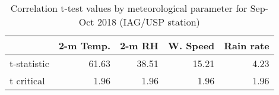 \begin{table}
\centering
\caption{Correlation t-test values by meteorological parameter for Sep-Oct 2018 (IAG/USP station)}
\label{tab: r_sign_iag}
\begin{tabular}{lrrrr}
\toprule
{} &  2-m Temp. &   2-m RH &  W. Speed &  Rain rate \\
\midrule
t-statistic &  61.63 &  38.51 &  15.21 &  4.23 \\
t critical  &   1.96 &   1.96 &   1.96 &  1.96 \\
\bottomrule
\end{tabular}
\end{table}


